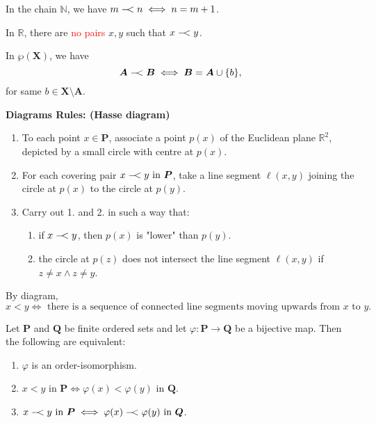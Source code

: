 \begin{example}
    In the chain $\mathbb{N}$, we have $m \mathrel{-\mkern-4mu}< n \iff n = m + 1$.
\end{example}
\begin{example}
    In $\mathbb{R}$, there are \textcolor{red}{no pairs} $x, y$ such that $x \mathrel{-\mkern-4mu}< y$.
\end{example}
\begin{example}
    In $\wp(\bm{X})$, we have 
    \[
        \bm{A} \mathrel{-\mkern-4mu}< \bm{B} \iff \bm{B} = \bm{A} \cup \{b\},
    \]
    for same $b \in \bm{X} \setminus \bm{A}$. 
\end{example}

\newpage 

\textbf{Diagrams Rules: (Hasse diagram)}
\begin{enumerate}
    \item To each point $x \in \bm{P}$, associate a point $p(x)$ of the Euclidean plane $\mathbb{R}^2$, depicted by a small circle with centre at $p(x)$.
    \item For each covering pair $x \mathrel{-\mkern-4mu}< y \text{ in } \bm{P}$, take a line segment $\ell(x,y)$ joining the circle at $p(x)$ to the circle at $p(y)$.
    \item Carry out 1. and 2. in such a way that:
        \begin{enumerate}
            \item if $x \mathrel{-\mkern-4mu}< y$, then $p(x)$ is "lower" than $p(y)$.
            \item the circle at $p(z)$ does not intersect the line segment $\ell(x,y)$ if $z \neq x \land z \neq y$.
        \end{enumerate}
\end{enumerate}
By diagram, 
\[
    x < y \iff \text{ there is a sequence of connected line segments moving upwards from } x \text{ to } y.
\]

\begin{lemma}
    Let $\bm{P}$ and $\bm{Q}$ be finite ordered sets and let $\varphi \colon \bm{P} \rightarrow \bm{Q}$ be a bijective map.
    Then the following are equivalent: 
    \begin{enumerate}
        \item $\varphi$ is an order-isomorphism. 
        \item $x < y \text{ in } \bm{P} \iff \varphi(x) < \varphi(y) \text{ in } \bm{Q}$.
        \item $x \mathrel{-\mkern-4mu}< y \text{ in } \bm{P} \iff \varphi(x) \mathrel{-\mkern-4mu}< \varphi(y) \text{ in } \bm{Q}$.
    \end{enumerate}
\end{lemma}

